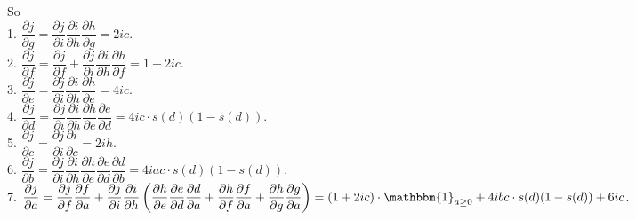 \documentclass[10pt]{article}
\begin{document}
\begin{enumerate}[1.]
So\\
1. $\dfrac{\partial j}{\partial g}=\dfrac{\partial j}{\partial i}\dfrac{\partial i}{\partial h}\dfrac{\partial h}{\partial g}=2ic$.\\

2. $\dfrac{\partial j}{\partial f}=\dfrac{\partial j}{\partial f}+\dfrac{\partial j}{\partial i}\dfrac{\partial i}{\partial h}\dfrac{\partial h}{\partial f}=1+2ic$.\\

3. $\dfrac{\partial j}{\partial e}=\dfrac{\partial j}{\partial i}\dfrac{\partial i}{\partial h}\dfrac{\partial h}{\partial e}=4ic$.\\

4. $\dfrac{\partial j}{\partial d}=\dfrac{\partial j}{\partial i}\dfrac{\partial i}{\partial h}\dfrac{\partial h}{\partial e}\dfrac{\partial e}{\partial d}=4ic\cdot s(d)(1-s(d))$.\\

5. $\dfrac{\partial j}{\partial c}=\dfrac{\partial j}{\partial i}\dfrac{\partial i}{\partial c}=2ih$.\\

6. $\dfrac{\partial j}{\partial b}=\dfrac{\partial j}{\partial i}\dfrac{\partial i}{\partial h}\dfrac{\partial h}{\partial e}\dfrac{\partial e}{\partial d}\dfrac{\partial d}{\partial b}=4iac\cdot s(d)(1-s(d))$.\\

7. $\dfrac{\partial j}{\partial a}=
\dfrac{\partial j}{\partial f}\dfrac{\partial f}{\partial a}+
\dfrac{\partial j}{\partial i}\dfrac{\partial i}{\partial h}\left(
\dfrac{\partial h}{\partial e}\dfrac{\partial e}{\partial d}\dfrac{\partial d}{\partial a}+
\dfrac{\partial h}{\partial f}\dfrac{\partial f}{\partial a}+
\dfrac{\partial h}{\partial g}\dfrac{\partial g}{\partial a}
\right)
=(1+2ic)\cdot\mathbbm{1}_{a\geq 0}+4ibc\cdot s(d)(1-s(d))+6ic$.

\end{enumerate}
\end{document}
